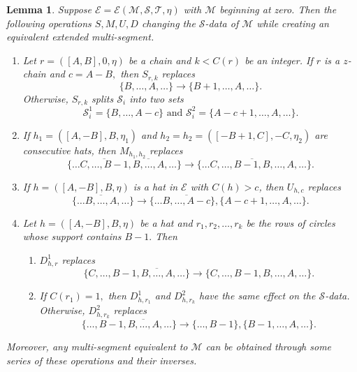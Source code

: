 \documentclass[11pt,letterpaper]{amsart}
\newcommand{\EE}{\mathcal{E}}
\newtheorem{lemma}[thm]{Lemma}
\numberwithin{equation}{section}
\begin{document}
\begin{lemma} \label{lem SMUD operators}
    Suppose $\EE = \mathcal{E}(\mathcal{M}, \mathcal{S}, \mathcal{T},\eta)$ with $\mathcal{M}$ beginning at zero. Then the following operations $S, M, U, D$ changing the $\mathcal{S}$-data of $\mathcal{M}$ while creating an equivalent extended multi-segment.
    
    \begin{enumerate}
        \item Let $r = ([A, B], 0, \eta)$ be a chain and $k < C(r)$ be an integer. If $r$ is a $z$-chain and $c = A - B,$ then $S_{r, k}$ replaces 
        $$\{B, \dots, A, \dots\} \longrightarrow \{B + 1, \dots, A, \dots\}.$$ Otherwise, $S_{r, k}$ splits $\mathcal{S}_i$ into two sets \[\mathcal{S}_i^1 = \{B, \dots, A - c\} \text{ and } \mathcal{S}_i^2 = \{A - c + 1, \dots, A, \dots\}.\]

        \item If $h_1 = ([A, -B], B, \eta_1)$ and $h_2 = h_2 = ([-B + 1, C], -C, \eta_2)$ are consecutive hats, then $M_{h_1, h_2}$ replaces
        $$\{\dots \overline{C, \dots, B - 1}, \overline{B, \dots, A}, \dots \} \longrightarrow \{\dots \overline{C, \dots, B - 1, B, \dots, A}, \dots \}.$$

        \item If $h = ([A, -B], B, \eta)$ is a hat in $\EE$ with $C(h) > c$, then $U_{h, c}$ replaces
        $$\{\dots \overline{B, \dots, A}, \dots \} \longrightarrow \{\dots \overline{B, \dots, A - c} \}, \{A - c + 1, \dots, A, \dots \}.$$

        \item Let $h = ([A, -B], B, \eta)$ be a hat and $r_1, r_2, \dots, r_k$ be the rows of circles whose support contains $B - 1.$ Then
        \begin{enumerate}
            \item $D_{h, r}^1$ replaces
            $$\{C, \dots, B - 1, \overline{B, \dots, A}, \dots\} \longrightarrow \{C, \dots, B - 1, B, \dots, A, \dots\}.$$
            \item If $C(r_1) = 1,$ then $D_{h, r_1}^1$ and $D_{h, r_k}^2$ have the same effect on the $\mathcal{S}$-data. Otherwise, $D_{h, r_k}^2$ replaces
            $$\{\dots, B - 1, \overline{B, \dots, A}, \dots\} \longrightarrow \{\dots, B - 1\}, \{B - 1, \dots, A, \dots\}.$$
        \end{enumerate}
    \end{enumerate}
    Moreover, any multi-segment equivalent to $\mathcal{M}$ can be obtained through some series of these operations and their inverses.
\end{lemma}
\end{document}

